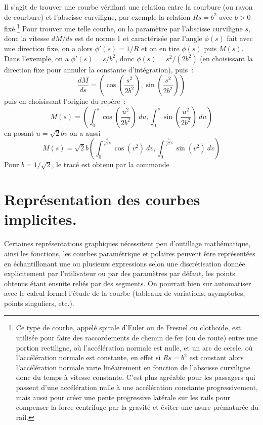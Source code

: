 \documentclass[a4paper,11pt]{article}
\begin{document}
\begin{giacjshere}
\begin{itemize}
Il s'agit de trouver une courbe v\'erifiant une relation entre la
courbure (ou rayon de courbure) et l'abscisse curviligne, par exemple
la relation $Rs=b^2$ avec $b>0$ fix\'e.\footnote{Ce type de courbe, appel\'e
spirale d'Euler ou de Fresnel ou clotho\"ide, est utilis\'ee pour
faire des raccordements de chemin de fer (ou de route) 
entre une portion rectiligne, o\`u l'acc\'el\'eration normale est
nulle, et un arc de cercle, o\`u l'acc\'el\'eration normale est
constante, en effet si $Rs=b^2$ est constant alors l'acc\'el\'eration
normale varie lin\'eairement en fonction de l'abscisse curviligne
donc du temps \`a vitesse constante. C'est plus agr\'eable pour
les passagers qui passent d'une acc\'el\'eration nulle \`a une
acc\'el\'eration constante progressivement, mais aussi pour
cr\'eer une pente progressive lat\'erale sur les rails pour compenser
la force centrifuge par la gravit\'e et \'eviter une usure
pr\'ematur\'ee du rail.}
Pour trouver une telle courbe, on la param\`etre par l'abscisse
curviligne $s$, donc la vitesse $dM/ds$ est de norme 1 et caract\'eris\'ee
par l'angle $\phi(s)$ fait avec une direction fixe, on a alors
$\phi'(s)=1/R$ et on en tire $\phi(s)$ puis $M(s)$. 
Dans l'exemple, on a $\phi'(s)=s/b^2$, donc $\phi(s)=s^2/(2b^2)$ (en
choisissant la direction fixe pour annuler la constante
d'int\'egration), puis~:
$$\frac{dM}{ds}=\left(\cos\left(\frac{s^2}{2b^2}\right),\sin\left(\frac{s^2}{2b^2}\right) \right) $$
puis en choisissant l'origine du rep\`ere~:
$$ M(s)=\left(
\int_0^s \cos\left(\frac{u^2}{2b^2}\right) \ du ,
\int_0^s \sin\left(\frac{u^2}{2b^2}\right)
\ du
\right)$$
en posant $u=\sqrt{2}b v$ on a aussi
$$ M(s)=\sqrt{2}b \left(\int_0^{\frac{s}{\sqrt{2}b}} \cos(v^2) \ dv ,
\int_0^{\frac{s}{\sqrt{2}b}} \sin(v^2) \ dv
\right)$$
Pour $b=1/\sqrt{2}$, le trac\'e est obtenu par la commande\\
\end{itemize}




\section{Repr\'esentation des courbes implicites.} \label{sec:implicite}
Certaines repr\'esentations graphiques n\'ecessitent peu d'outillage
math\'ematique, ainsi les fonctions, les courbes param\'etrique
et polaires peuvent \^etre repr\'esent\'ees en \'echantillonant 
une ou plusieurs expressions
selon une discr\'etisation donn\'ee explicitement par l'utilisateur
ou par des param\`etres par d\'efaut, les points obtenus
\'etant ensuite reli\'es par des segments.
On pourrait bien sur automatiser avec le calcul
formel l'\'etude de la courbe (tableaux de variations,
asymptotes, points singuliers, etc.).


\end{giacjshere}
\end{document}

